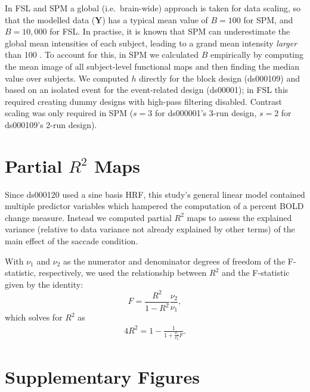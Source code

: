 In FSL and SPM a global (i.e.\ brain-wide) approach is taken for data scaling, so that the modelled data ($\bm{Y}$) has a typical mean value of $B=100$ for SPM, and $B=10,000$ for FSL. In practise, it is known that SPM can underestimate the global mean intensities of each subject, leading to a grand mean intensity \textit{larger} than 100 \citep{Nichols2012-rx}. To account for this, in SPM we calculated $B$ empirically by computing the mean image of all subject-level functional maps and then finding the median value over subjects.  We computed $h$ directly for the block design (ds000109) and based on an isolated event for the event-related design (ds00001); in FSL this required creating dummy designs with high-pass filtering disabled.  Contrast scaling was only required in SPM ($s=3$ for ds000001's 3-run design, $s=2$ for ds000109's 2-run design).



\pagebreak

\section{Partial $R^{2}$ Maps}
\label{App:SC_supplementary_R2}

Since ds000120 used a sine basis HRF, this study's general linear model contained multiple predictor variables which hampered the computation of a percent BOLD change measure.  Instead we computed partial $R^{2}$ maps to assess the explained variance (relative to data variance not already explained by other terms) of the main effect of the saccade condition.

With $\nu_{1}$ and $\nu_{2}$ as the numerator and denominator degrees of freedom of the F-statistic, respectively, we used the relationship between $R^{2}$ and the F-statistic given by the identity:
%
\begin{equation}
\label{eq:SC_sup_F_to_R}
F = \frac{R^2}{1-R^2}  \frac{\nu_2}{\nu_1},
\end{equation}
%
which solves for $R^{2}$ as
%
\begin{alignat}{4}\label{eq:SC_sup_R_to_F}
  R^2 =  1 - \frac{1}{1 + \frac{\nu_1}{\nu_2} F}.
\end{alignat}

\pagebreak

\section{Supplementary Figures}
\label{App:SC_supplementary_figures}

